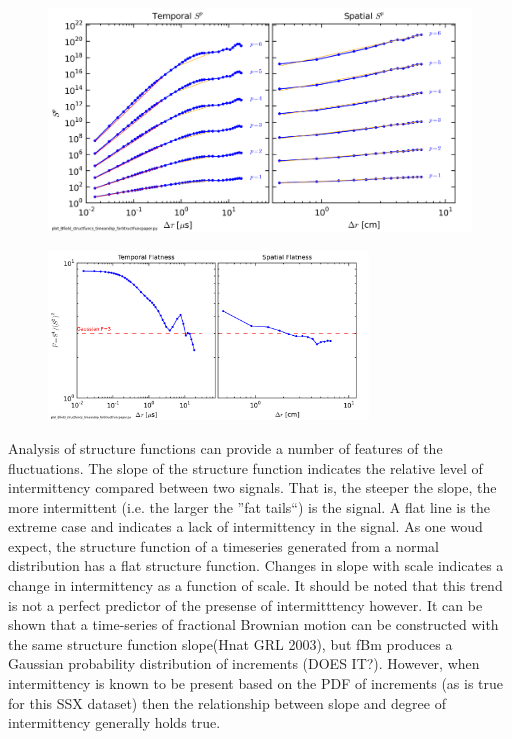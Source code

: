 \documentclass[aps,prl,amsmath,amssymb,reprint,superscriptaddress]{revtex4-1} %
\begin{document}
\begin{figure}[!htbp]
\centerline{
\includegraphics[width=17cm]{Bmod_timeandspace_StructureFunction100313Shots41to80_forStructFuncpaper.png}}
\caption{\label{fig:structfuncs} }
\end{figure}

\begin{figure}[!htbp]
\centerline{
\includegraphics[width=8.5cm]{Bmod_timeandspace_Flatness100313Shots41to80_forStructFuncpaper.png}}
\caption{\label{fig:flatness} }
\end{figure}

Analysis of structure functions can provide a number of features of the fluctuations. The slope of the structure function indicates the relative level of intermittency compared between two signals. That is, the steeper the slope, the more intermittent (i.e. the larger the ''fat tails``) is the signal. A flat line is the extreme case and indicates a lack of intermittency in the signal. As one woud expect, the structure function of a timeseries generated from a normal distribution has a flat structure function. Changes in slope with scale indicates a change in intermittency as a function of scale. It should be noted that this trend is not a perfect predictor of the presense of intermitttency however. It can be shown that a time-series of fractional Brownian motion can be constructed with the same structure function slope(Hnat GRL 2003), but fBm produces a Gaussian probability distribution of increments (DOES IT?). However, when intermittency is known to be present based on the PDF of increments (as is true for this SSX dataset) then the relationship between slope and degree of intermittency generally holds true.
\end{document}
